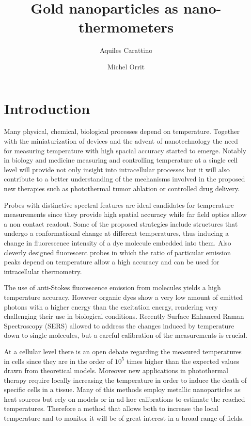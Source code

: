 \documentclass[journal=nalefd,manuscript=letter]{achemso}
\author{Aquiles Carattino}
\affiliation[Leiden]
{Huygens-Kamerlingh Onnes Lab, 2300RA Leiden, The Netherlands}
\author{Michel Orrit}
\affiliation[Leiden]
{Huygens-Kamerlingh Onnes Lab, 2300RA Leiden, The Netherlands}
\title{Gold nanoparticles as nano-thermometers}
\begin{document}
\maketitle
{}
\section{Introduction}
Many physical, chemical, biological processes depend on temperature. Together
with the miniaturization of devices and the advent of nanotechnology the need
for measuring temperature with high spacial accuracy started to emerge. Notably
in biology\cite{Yang2011a,Hrelescu2010} and medicine\cite{Li2013c}
measuring and controlling temperature at a single cell level will provide not only insight into
intracellular processes but it will also contribute to a better understanding of
the mechanisms involved in the proposed new therapies such as photothermal tumor
ablation\cite{Gobin2007} or controlled drug
delivery\cite{Huang2006}\cite{Huo2014}.

Probes with distinctive spectral features are ideal candidates for temperature
measurements since they provide high spatial accuracy while far field optics
allow a non contact readout. Some of the proposed strategies include structures
that undergo a conformational change at different
temperatures\cite{Ebrahimi2014}, thus inducing a change in fluorescence
intensity of a dye molecule embedded into them. Also cleverly designed
fluorescent probes\cite{Vetrone2010} in which the ratio of particular emission
peaks depend on temperature allow a high accuracy and can be used for
intracellular thermometry.

The use of anti-Stokes fluorescence emission from molecules yields a high
temperature accuracy\cite{Auzel2004a}. However organic dyes show a very low
amount of emitted photons with a higher energy than the excitation energy,
rendering very challenging their use in biological conditions. Recently Surface
Enhanced Raman Spectroscopy (SERS) allowed to address the changes induced by
temperature down to single-molecules\cite{Pozzi2015}, but a careful calibration
of the measurements is crucial.

At a cellular level there is an open debate regarding the measured temperatures
in cells since they are in the order of $10^5$ times higher than the expected
values drawn from theoretical models\cite{Yang2011a}\cite{Suzuki2015}. Moreover
new applications in photothermal therapy require locally increasing the
temperature in order to induce the death of specific cells in a
tissue\cite{Huang2008}\cite{Huang2006}. Many of this methods employ metallic
nanoparticles as heat sources\cite{Gobin2007}\cite{Hirsch2003} but rely on
models\cite{Zhao2014} or in ad-hoc calibrations to estimate the reached
temperatures\cite{Donner2013}. Therefore a method that allows both to increase
the local temperature and to monitor it will be of great interest in a broad
range of fields.
\end{document}
